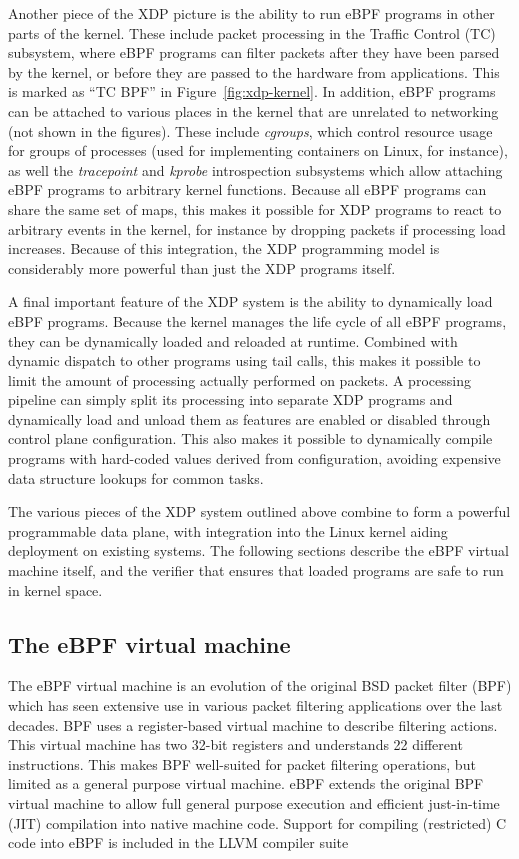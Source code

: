\documentclass[10pt,sigconf]{acmart}
\begin{document}
Another piece of the XDP picture is the ability to run eBPF programs in other
parts of the kernel. These include packet processing in the Traffic Control (TC)
subsystem, where eBPF programs can filter packets after they have been parsed by
the kernel, or before they are passed to the hardware from applications. This is
marked as ``TC BPF'' in Figure~\ref{fig:xdp-kernel}. In addition, eBPF programs
can be attached to various places in the kernel that are unrelated to networking
(not shown in the figures). These include \emph{cgroups}, which control resource
usage for groups of processes (used for implementing containers on Linux, for
instance), as well the \emph{tracepoint} and \emph{kprobe} introspection
subsystems which allow attaching eBPF programs to arbitrary kernel functions.
Because all eBPF programs can share the same set of maps, this makes it possible
for XDP programs to react to arbitrary events in the kernel, for instance by
dropping packets if processing load increases. Because of this integration, the
XDP programming model is considerably more powerful than just the XDP programs
itself.

A final important feature of the XDP system is the ability to dynamically load
eBPF programs. Because the kernel manages the life cycle of all eBPF programs,
they can be dynamically loaded and reloaded at runtime. Combined with dynamic
dispatch to other programs using tail calls, this makes it possible to limit the
amount of processing actually performed on packets. A processing pipeline can
simply split its processing into separate XDP programs and dynamically load and
unload them as features are enabled or disabled through control plane
configuration. This also makes it possible to dynamically compile programs with
hard-coded values derived from configuration, avoiding expensive data structure
lookups for common tasks.

The various pieces of the XDP system outlined above combine to form a powerful
programmable data plane, with integration into the Linux kernel aiding
deployment on existing systems. The following sections describe the eBPF virtual
machine itself, and the verifier that ensures that loaded programs are safe to
run in kernel space.

\subsection{The eBPF virtual machine}
\label{sec:bpf-vm}
The eBPF virtual machine is an evolution of the original BSD packet filter (BPF)
\cite{mccanne_bsd_1993} which has seen extensive use in various packet filtering
applications over the last decades. BPF uses a register-based virtual machine to
describe filtering actions. This virtual machine has two 32-bit registers and
understands 22 different instructions. This makes BPF well-suited for packet
filtering operations, but limited as a general purpose virtual machine. eBPF
extends the original BPF virtual machine to allow full general purpose execution
and efficient just-in-time (JIT) compilation into native machine code. Support
for compiling (restricted) C code into eBPF is included in the LLVM compiler
suite
\end{document}
